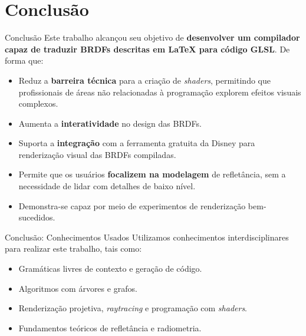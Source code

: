 \section{Conclusão}
\begin{frame}{Conclusão}
    Este trabalho alcançou seu objetivo de \textbf{desenvolver um compilador capaz de traduzir BRDFs descritas em \LaTeX{} para código GLSL}. De forma que:

    \begin{itemize}
        \item Reduz a \textbf{barreira técnica} para a criação de \textit{shaders}, permitindo que profissionais de áreas não relacionadas à programação explorem efeitos visuais complexos.
        \item Aumenta a \textbf{interatividade} no design das BRDFs.
        \item Suporta a \textbf{integração} com a ferramenta gratuita da Disney para renderização visual das BRDFs compiladas.
        \item Permite que os usuários \textbf{focalizem na modelagem} de refletância, sem a necessidade de lidar com detalhes de baixo nível.
        \item Demonstra-se capaz por meio de experimentos de renderização bem-sucedidos.
    \end{itemize}
\end{frame}


\begin{frame}{Conclusão: Conhecimentos Usados}
    Utilizamos conhecimentos interdisciplinares para realizar este trabalho, tais como:
    \begin{itemize}
        \item Gramáticas livres de contexto e geração de código.
        \item Algoritmos com árvores e grafos.
        \item Renderização projetiva, \textit{raytracing} e programação com \textit{shaders}.
        \item Fundamentos teóricos de refletância e radiometria.
    \end{itemize}
\end{frame}

